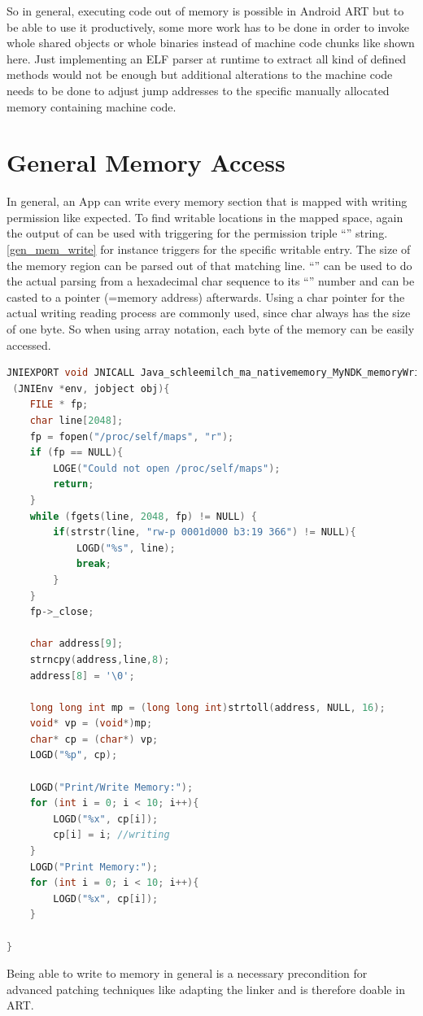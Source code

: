 So in general, executing code out of memory is possible in Android ART but to be able
to use it productively, some more work has to be done in order to invoke whole shared
objects or whole binaries instead of machine code chunks like shown here. Just implementing an ELF parser at runtime to extract all kind of defined methods would not be enough but additional alterations to the machine code needs to be done to adjust jump addresses to the specific manually allocated memory containing machine code.


\section{General Memory Access}\label{section:general_mem_access}
In general, an App can write every memory section that is mapped with writing permission like expected. To find writable locations in the mapped space, again the output of  can be used with triggering for the permission triple ``'' string. \autoref{gen_mem_write} for instance triggers for the specific writable  entry. The size of the memory region can be parsed out of that matching line. ``'' can be used to do the actual parsing from a
hexadecimal char sequence to its ``'' number and can be casted to a pointer (=memory address) afterwards.
Using a char pointer for the actual writing reading process
are commonly used, since char always has the size of one byte. So when using array notation, each byte of the memory can be easily accessed.
\begin{lstlisting}[language=C++, caption=memoryWriting(), label=gen_mem_write]
JNIEXPORT void JNICALL Java_schleemilch_ma_nativememory_MyNDK_memoryWriting
 (JNIEnv *env, jobject obj){
    FILE * fp;
    char line[2048];
    fp = fopen("/proc/self/maps", "r");
    if (fp == NULL){
        LOGE("Could not open /proc/self/maps");
        return;
    }
    while (fgets(line, 2048, fp) != NULL) {
        if(strstr(line, "rw-p 0001d000 b3:19 366") != NULL){
            LOGD("%s", line);
            break;
        }
    }
    fp->_close;

    char address[9];
    strncpy(address,line,8);
    address[8] = '\0';

    long long int mp = (long long int)strtoll(address, NULL, 16);
    void* vp = (void*)mp;
    char* cp = (char*) vp;
    LOGD("%p", cp);

    LOGD("Print/Write Memory:");
    for (int i = 0; i < 10; i++){
        LOGD("%x", cp[i]);
        cp[i] = i; //writing
    }
    LOGD("Print Memory:");
    for (int i = 0; i < 10; i++){
        LOGD("%x", cp[i]);
    }

}
\end{lstlisting}
Being able to write to memory in general is a necessary precondition for advanced patching techniques like adapting the linker and is therefore doable in ART.

